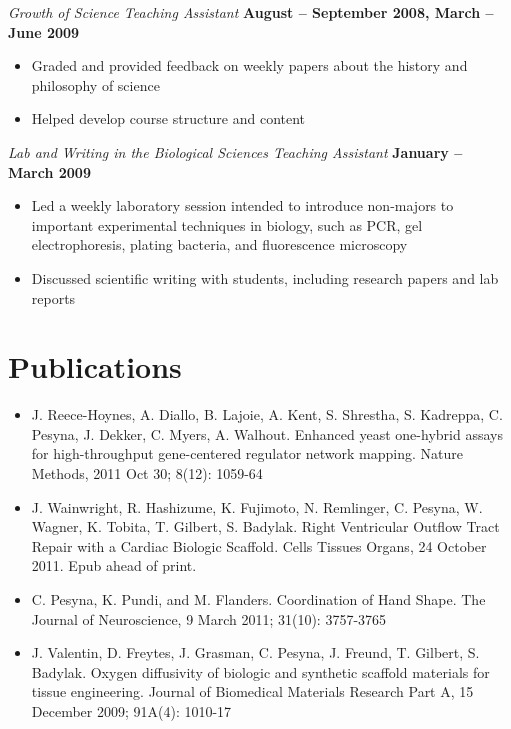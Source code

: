 \documentclass[margin,line]{resume}
\begin{document}
\begin{resume}
    \textsl{Growth of Science Teaching Assistant} \hfill \textbf{August -- September 2008, March -- June 2009}
    \begin{itemize}
    \item Graded and provided feedback on weekly papers about the history and philosophy of science
    \item Helped develop course structure and content
    \end{itemize}

    \textsl{Lab and Writing in the Biological Sciences Teaching Assistant} \hfill \textbf{January -- March 2009}\vspace{1mm}%
    \begin{itemize}
    \item Led a weekly laboratory session intended to introduce non-majors to important experimental techniques in biology, such as PCR, gel electrophoresis, plating bacteria, and fluorescence microscopy
    \item Discussed scientific writing with students, including research papers and lab reports 
    \end{itemize}

    \section{\mysidestyle Publications}

    \begin{itemize}
    \item J. Reece-Hoynes, A. Diallo, B. Lajoie, A. Kent, S. Shrestha, S. Kadreppa, C. Pesyna, J. Dekker, C. Myers, A. Walhout. Enhanced yeast one-hybrid assays for high-throughput gene-centered regulator network mapping. Nature Methods, 2011 Oct 30; 8(12): 1059-64
    \item J. Wainwright, R. Hashizume, K. Fujimoto, N. Remlinger, C. Pesyna, W. Wagner, K. Tobita, T. Gilbert, S. Badylak. Right Ventricular Outflow Tract Repair with a Cardiac Biologic Scaffold. Cells Tissues Organs, 24 October 2011. Epub ahead of print.
    \item C. Pesyna, K. Pundi, and M. Flanders. Coordination of Hand Shape. The Journal of Neuroscience, 9 March 2011; 31(10): 3757-3765
    \item J. Valentin, D. Freytes, J. Grasman, C. Pesyna, J. Freund, T. Gilbert, S. Badylak. Oxygen diffusivity of biologic and synthetic scaffold materials for tissue engineering. Journal of Biomedical Materials Research Part A, 15 December 2009; 91A(4): 1010-17
    \end{itemize}


\end{resume}
\end{document}
